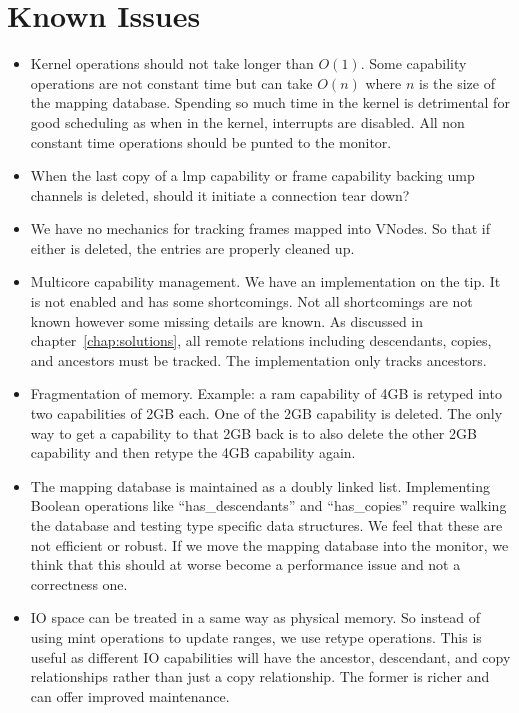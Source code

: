 \documentclass[a4paper,twoside]{report} %
\begin{document}
\chapter{Known Issues}\label{chap:known_issues}
\begin{itemize}

\item Kernel operations should not take longer than $O(1)$.  Some
  capability operations are not constant time but can take $O(n)$
  where $n$ is the size of the mapping database. Spending so much time
  in the kernel is detrimental for good scheduling as when in the
  kernel, interrupts are disabled. All non constant time operations
  should be punted to the monitor.

\item When the last copy of a lmp capability or frame capability
  backing ump channels is deleted, should it initiate a connection
  tear down?

\item We have no mechanics for tracking frames mapped into VNodes. So
  that if either is deleted, the entries are properly cleaned up.

\item Multicore capability management. We have an implementation on
  the tip. It is not enabled and has some shortcomings. Not all
  shortcomings are not known however some missing details are
  known. As discussed in chapter~\ref{chap:solutions}, all remote
  relations including descendants, copies, and ancestors must be
  tracked. The implementation only tracks ancestors.

\item Fragmentation of memory. Example: a ram capability of 4GB is
  retyped into two capabilities of 2GB each. One of the 2GB capability
  is deleted. The only way to get a capability to that 2GB back is to
  also delete the other 2GB capability and then retype the 4GB
  capability again.

\item The mapping database is maintained as a doubly linked
  list. Implementing Boolean operations like ``has\_descendants'' and
  ``has\_copies'' require walking the database and testing type
  specific data structures. We feel that these are not efficient or
  robust. If we move the mapping database into the monitor, we think
  that this should at worse become a performance issue and not a
  correctness one.

\item IO space can be treated in a same way as physical memory. So
  instead of using mint operations to update ranges, we use retype
  operations. This is useful as different IO capabilities will have
  the ancestor, descendant, and copy relationships rather than just a
  copy relationship. The former is richer and can offer improved
  maintenance.


\end{itemize}
\end{document}
